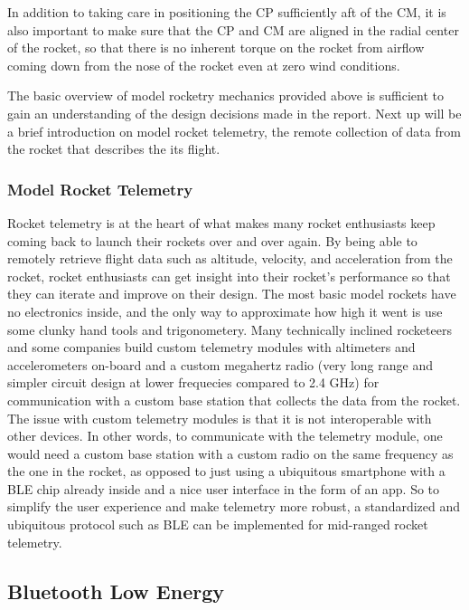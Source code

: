 \documentclass{workreport}
\begin{document}
\begin{body}
	In addition to taking care in positioning the CP sufficiently aft of the CM, it is also important to make sure that the CP and CM are aligned in the radial center of the rocket, so that there is no inherent torque on the rocket from airflow coming down from the nose of the rocket even at zero wind conditions.

	The basic overview of model rocketry mechanics provided above is sufficient to gain an understanding of the design decisions made in the report. Next up will be a brief introduction on model rocket telemetry, the remote collection  of data from the rocket that describes the its flight.

	\subsubsection{Model Rocket Telemetry}
	Rocket telemetry is at the heart of what makes many rocket enthusiasts keep coming back to launch their rockets over and over again. By being able to remotely retrieve flight data such as altitude, velocity, and acceleration from the rocket, rocket enthusiasts can get insight into their rocket's performance so that they can iterate and improve on their design. The most basic model rockets have no electronics inside, and the only way to approximate how high it went is use some clunky hand tools and trigonometery. Many technically inclined rocketeers and some companies build custom telemetry modules with altimeters and accelerometers on-board and a custom megahertz radio (very long range and simpler circuit design at lower frequecies compared to 2.4 GHz) for communication with a custom base station that collects the data from the rocket. The issue with custom telemetry modules is that it is not interoperable with other devices. In other words, to communicate with the telemetry module, one would need a custom base station with a custom radio on the same frequency as the one in the rocket, as opposed to just using a ubiquitous smartphone with a BLE chip already inside and a nice user interface in the form of an app. So to simplify the user experience and make telemetry more robust, a standardized and ubiquitous protocol such as BLE can be implemented for mid-ranged rocket telemetry.

\subsection{Bluetooth Low Energy}


\end{body}
\end{document}
